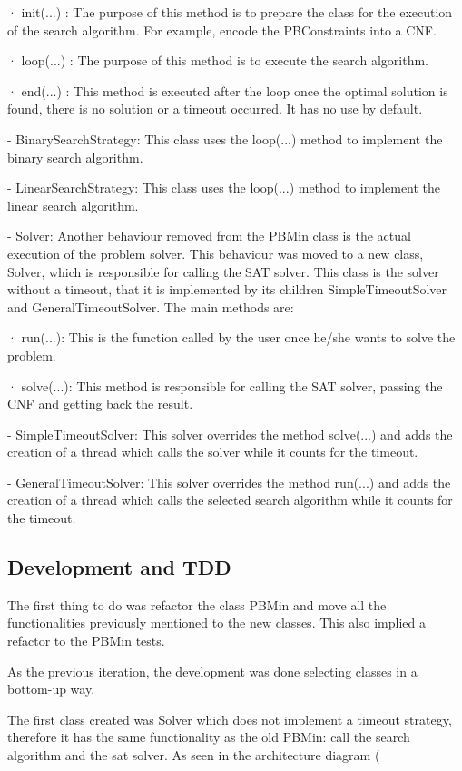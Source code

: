 · init(...) : The purpose of this method is to prepare the class for the execution of the search algorithm. For example, encode the PBConstraints   into a CNF.  

· loop(...) : The purpose of this method is to execute the search algorithm.  

· end(...) : This method is executed after the loop once the optimal solution is found, there is no solution or a timeout occurred. It has no use by default.  

- BinarySearchStrategy: This class uses the loop(...) method to implement the binary search algorithm. 

- LinearSearchStrategy: This class uses the loop(...) method to implement the linear search algorithm. 

- Solver: Another behaviour removed from the PBMin class is the actual execution of the problem solver. This behaviour was moved to a new class, Solver, which is responsible for calling the SAT solver. This class is the solver without a timeout, that it is implemented by its children SimpleTimeoutSolver and GeneralTimeoutSolver. The main methods are: 

· run(...): This is the function called by the user once he/she wants to solve the problem.  

· solve(...): This method is responsible for calling the SAT solver, passing the CNF and getting back the result. 

- SimpleTimeoutSolver: This solver overrides the method solve(...) and adds the creation of a thread which calls the solver while it counts for the timeout.  

- GeneralTimeoutSolver: This solver overrides the method run(...) and adds the creation of a thread which calls the selected search algorithm while it counts for the timeout. 

\subsection{Development and TDD}
The first thing to do was refactor the class PBMin and move all the functionalities previously mentioned to the new classes. This also implied a refactor to the PBMin tests.  



As the previous iteration, the development was done selecting classes in a bottom-up way.  



The first class created was Solver which does not implement a timeout strategy, therefore it has the same functionality as the old PBMin: call the search algorithm and the sat solver. As seen in the architecture diagram (%



